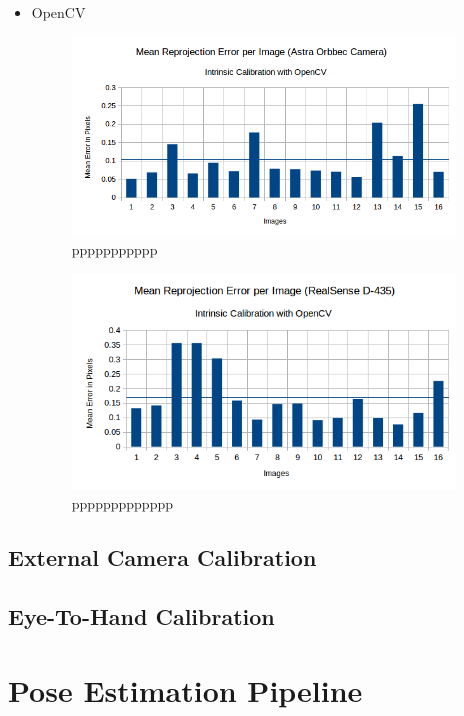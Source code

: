 \begin{itemize}
\item OpenCV


\begin{figure}[!h]
\begin{center}
\includegraphics[width=4in]{figures05/opencv_int_cal_astra.png}
\caption{ppppppppppp}%
\label{fig:target0}
\end{center}
\end{figure}

\begin{figure}[!h]
\begin{center}
\includegraphics[width=4in]{figures05/opencv_int_cal_real.png}
\caption{ppppppppppppp}%
\label{fig:target0}
\end{center}
\end{figure}


\end{itemize} 



\subsection{External Camera Calibration}


\subsection{Eye-To-Hand Calibration}


\section{Pose Estimation Pipeline}